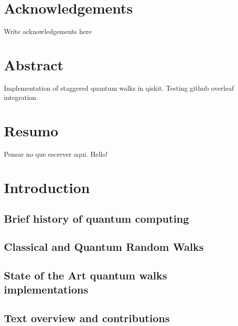 \documentclass[
oneside,
11pt, a4paper,
footinclude=true,
headinclude=true,
cleardoublepage=empty
]{scrbook}
\author{Jaime Santos}
\date{\myear} %
\begin{document}
\umfrontcover	
\umtitlepage

\chapter*{Acknowledgements}
Write acknowledgements here


\chapter*{Abstract}
Implementation of staggered quantum walks in qiskit.
Testing github overleaf integration.

\cleardoublepage
\chapter*{Resumo}
Pensar no que escrever aqui.
Hello!	

\tableofcontents
\listoffigures
\listoftables



\chapter{Introduction}\label{chap:introduction}
\section{Brief history of quantum computing}

\section{Classical and Quantum Random Walks}

\section{State of the Art quantum walks implementations}

\section{Text overview and contributions}

\end{document}
